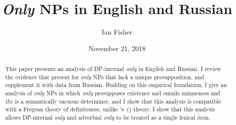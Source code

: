 \documentclass{article}
\title{\textit{Only} NPs in English and Russian}
\author{Ian Fisher}
\date{November 21, 2018}
\newcommand{\citegen}[1]{\citeauthor{#1}'s~(\citeyear{#1})}
\begin{document}
\maketitle

\begin{abstract}
This paper presents an analysis of DP-internal \textit{only} in English and Russian. I review the evidence that \citet{cb2012b, cb2015} present for \textit{only} NPs that lack a unique presupposition, and supplement it with data from Russian. Building on this empirical foundation, I give an analysis of \textit{only} NPs in which \textit{only} presupposes existence and entails uniqueness and \textit{the} is a semantically vacuous determiner, and I show that this analysis is compatible with a Fregean theory of definiteness, unlike \citegen{cb2015} theory. I show that this analysis allows DP-internal \textit{only} and adverbial \textit{only} to be treated as a single lexical item.
\end{abstract}












\end{document}
